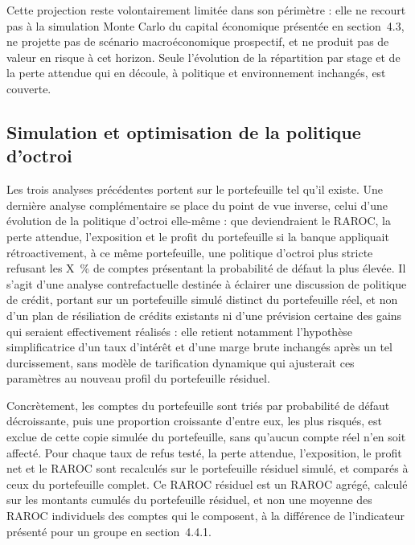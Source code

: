 Cette projection reste volontairement limitée dans son périmètre : elle ne recourt pas à la simulation Monte Carlo du capital économique présentée en section~4.3, ne projette pas de scénario macroéconomique prospectif, et ne produit pas de valeur en risque à cet horizon. Seule l'évolution de la répartition par stage et de la perte attendue qui en découle, à politique et environnement inchangés, est couverte.

\subsection{Simulation et optimisation de la politique d'octroi}

Les trois analyses précédentes portent sur le portefeuille tel qu'il existe. Une dernière analyse complémentaire se place du point de vue inverse, celui d'une évolution de la politique d'octroi elle-même : que deviendraient le RAROC, la perte attendue, l'exposition et le profit du portefeuille si la banque appliquait rétroactivement, à ce même portefeuille, une politique d'octroi plus stricte refusant les X~\% de comptes présentant la probabilité de défaut la plus élevée. Il s'agit d'une analyse contrefactuelle destinée à éclairer une discussion de politique de crédit, portant sur un portefeuille simulé distinct du portefeuille réel, et non d'un plan de résiliation de crédits existants ni d'une prévision certaine des gains qui seraient effectivement réalisés : elle retient notamment l'hypothèse simplificatrice d'un taux d'intérêt et d'une marge brute inchangés après un tel durcissement, sans modèle de tarification dynamique qui ajusterait ces paramètres au nouveau profil du portefeuille résiduel.

Concrètement, les comptes du portefeuille sont triés par probabilité de défaut décroissante, puis une proportion croissante d'entre eux, les plus risqués, est exclue de cette copie simulée du portefeuille, sans qu'aucun compte réel n'en soit affecté. Pour chaque taux de refus testé, la perte attendue, l'exposition, le profit net et le RAROC sont recalculés sur le portefeuille résiduel simulé, et comparés à ceux du portefeuille complet. Ce RAROC résiduel est un RAROC agrégé, calculé sur les montants cumulés du portefeuille résiduel, et non une moyenne des RAROC individuels des comptes qui le composent, à la différence de l'indicateur présenté pour un groupe en section~4.4.1.


